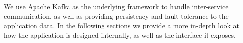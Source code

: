 We use Apache Kafka as the underlying framework to handle inter-service communication, as well as providing persistency and fault-tolerance to the application data.
In the following sections we provide a more in-depth look at how the application is designed internally, as well as the interface it exposes.